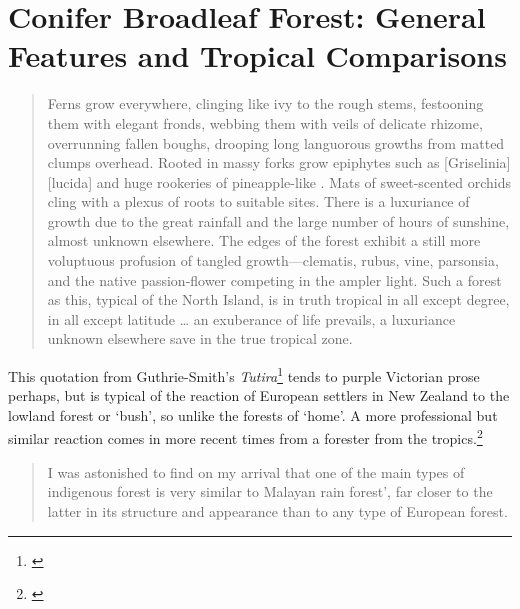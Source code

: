 \chapter{Conifer Broadleaf Forest: General Features and Tropical Comparisons}

\begin{quote}
	Ferns grow everywhere, clinging like ivy to the rough stems, festooning them with elegant fronds, webbing them with veils of delicate rhizome, overrunning fallen boughs, drooping long languorous growths from matted clumps overhead.
	Rooted in massy forks grow epiphytes such as [Griselinia][lucida] and huge rookeries of pineapple-like .
	Mats of sweet-scented orchids cling with a plexus of roots to suitable sites.
	There is a luxuriance of growth due to the great rainfall and the large number of hours of sunshine, almost unknown elsewhere.
	The edges of the forest exhibit a still more voluptuous profusion of tangled growth---clematis, rubus, vine, parsonsia, and the native passion-flower competing in the ampler light.
	Such a forest as this, typical of the North Island, is in truth tropical in all except degree, in all except latitude … an exuberance of life prevails, a luxuriance unknown elsewhere save in the true tropical zone.
\end{quote}

This quotation from  Guthrie-Smith's \emph{Tutira}\footnote{\cite{guthriesmith1926tutira}} tends to purple Victorian prose perhaps, but is typical of the reaction of European settlers in New Zealand to the lowland forest or `bush', so unlike the forests of `home'.
A more professional but similar reaction comes in more recent times from a forester from the tropics.\footnote{\cite{brown1960forester}}

\begin{quote}
	I was astonished to find on my arrival that one of the main types of indigenous forest is very similar to Malayan rain forest', far closer to the latter in its structure and appearance than to any type of European forest.
\end{quote}

